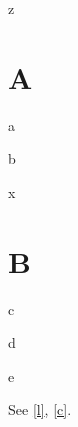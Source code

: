 \documentclass[envcountsect,envcountsame]{llncs}
\begin{document}
\begin{lemma}z\end{lemma}
\section{A}
\begin{hyp}a\end{hyp}
\begin{conj2}b\end{conj2}
\begin{lemma}\label{l}x\end{lemma}
\section{B}
\begin{hyp}c\end{hyp}
\begin{conj2}\label{c}d\end{conj2}
\begin{theorem}e\end{theorem}
See \ref{l}, \ref{c}.
\end{document}
